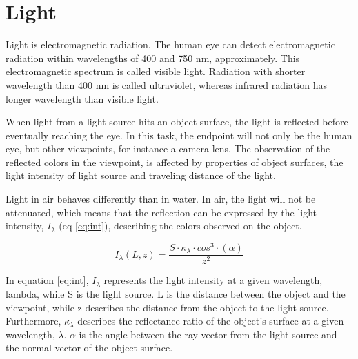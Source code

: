 


\section{Light}
Light is electromagnetic radiation. The human eye can detect electromagnetic radiation within wavelengths of 400 and 750 nm, approximately. This electromagnetic spectrum is called visible light. Radiation with shorter wavelength than 400 nm is called ultraviolet, whereas infrared radiation has longer wavelength than visible light.

When light from a light source hits an object surface, the light is reflected before eventually reaching the eye. In this task, the endpoint will not only be the human eye, but other viewpoints, for instance a camera lens. The observation of the reflected colors in the viewpoint, is affected by properties of object surfaces, the light intensity of light source and traveling distance of the light.

Light in air behaves differently than in water. In air, the light will not be attenuated, which means that the reflection can be expressed by the light intensity, $I_ {\lambda}$ (eq \ref{eq:int}), describing the colors observed on the object.

\begin{equation} \label{eq:int}
    I_ {\lambda} (L, z) = \frac{S \cdot \kappa_{\lambda}\cdot cos^{3}\cdot (\alpha)}{z^2}
\end{equation}


In equation \ref{eq:int}, $I_{\lambda}$ represents the light intensity at a given wavelength, lambda, while S is the light source. L is the distance between the object and the viewpoint, while z describes the distance from the object to the light source. Furthermore, $\kappa_{\lambda}$ describes the reflectance ratio of the object's surface at a given wavelength, $\lambda$. $\alpha$ is the angle between the ray vector from the light source and the normal vector of the object surface.


